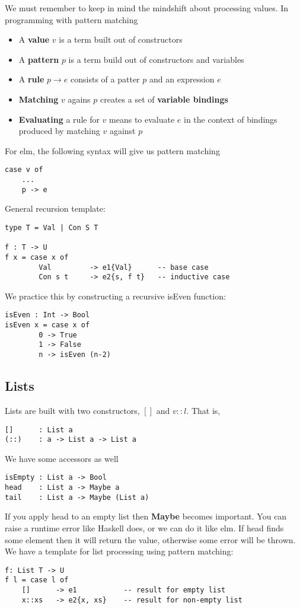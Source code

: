 \documentclass{article}
\theoremstyle{definition}
\begin{document}
We must remember to keep in mind the mindshift about processing values.
In programming with pattern matching 
\begin{itemize}
    \item A \textbf{value} $v$ is a term built out of constructors
    \item A \textbf{pattern} $p$ is a term build out of constructors and variables
    \item A \textbf{rule} $p \to e$ consists of a patter $p$ and an expression $e$
    \item \textbf{Matching} $v$ agains $p$ creates a set of \textbf{variable bindings}
    \item \textbf{Evaluating} a rule for $v$ means to evaluate $e$ in the context of bindings produced by matching $v$ against $p$
\end{itemize}
For elm, the following syntax will give us pattern matching
\begin{verbatim}
case v of
    ...
    p -> e
\end{verbatim}
General recursion template:
\begin{mdframed}[]
    \begin{verbatim}
type T = Val | Con S T

f : T -> U
f x = case x of 
        Val         -> e1{Val}      -- base case
        Con s t     -> e2{s, f t}   -- inductive case
    \end{verbatim}
\end{mdframed}
We practice this by constructing a recursive isEven function:
\begin{mdframed}[]
    \begin{verbatim}
isEven : Int -> Bool
isEven x = case x of
        0 -> True
        1 -> False
        n -> isEven (n-2)
    \end{verbatim}
\end{mdframed}
\subsection{Lists}
Lists are built with two constructors, $[]$ and $v::l$. That is, 
\begin{verbatim}
[]      : List a
(::)    : a -> List a -> List a
\end{verbatim}
We have some accessors as well
\begin{verbatim}
isEmpty : List a -> Bool
head    : List a -> Maybe a
tail    : List a -> Maybe (List a)
\end{verbatim}
If you apply head to an empty list then \textbf{Maybe} becomes important. You can raise a runtime error 
like Haskell does, or we can do it like elm. If head finds some element then it will return the value,
otherwise some error will be thrown.
We have a template for list processing using pattern matching:
\begin{mdframed}[]
    \begin{verbatim}
f: List T -> U
f l = case l of
    []      -> e1           -- result for empty list
    x::xs   -> e2{x, xs}    -- result for non-empty list
    \end{verbatim}
\end{mdframed}
\end{document}
